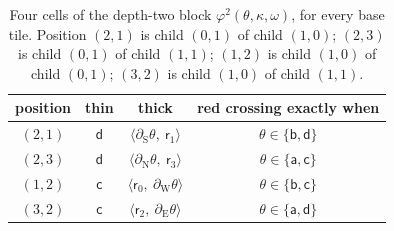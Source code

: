 \begin{table}[ht]
\centering
\begin{tabular}{c|c|c|c}
position & thin & thick & red crossing exactly when\\\hline
$(2,1)$ & $\mathsf d$ & $\langle\partial_{\mathrm S}\theta,\ \mathsf r_1\rangle$ & $\theta\in\{\mathsf b,\mathsf d\}$\\
$(2,3)$ & $\mathsf d$ & $\langle\partial_{\mathrm N}\theta,\ \mathsf r_3\rangle$ & $\theta\in\{\mathsf a,\mathsf c\}$\\
$(1,2)$ & $\mathsf c$ & $\langle\mathsf r_0,\ \partial_{\mathrm W}\theta\rangle$ & $\theta\in\{\mathsf b,\mathsf c\}$\\
$(3,2)$ & $\mathsf c$ & $\langle\mathsf r_2,\ \partial_{\mathrm E}\theta\rangle$ & $\theta\in\{\mathsf a,\mathsf d\}$
\end{tabular}
\caption{Four cells of the depth-two block $\varphi^2(\theta,\kappa,\omega)$, for every base tile. Position $(2,1)$ is child $(0,1)$ of child $(1,0)$; $(2,3)$ is child $(0,1)$ of child $(1,1)$; $(1,2)$ is child $(1,0)$ of child $(0,1)$; $(3,2)$ is child $(1,0)$ of child $(1,1)$.}
\label{scf:tab-witness}
\end{table}
